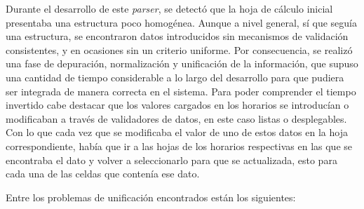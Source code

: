 Durante el desarrollo de este \textit{parser}, se detectó que la hoja de cálculo inicial presentaba una estructura poco homogénea. Aunque a nivel general, sí que seguía una estructura, se encontraron datos introducidos sin mecanismos de validación consistentes, y en ocasiones sin un criterio uniforme. Por consecuencia, se realizó una fase de depuración, normalización y unificación de la información, que supuso una cantidad de tiempo considerable a lo largo del desarrollo para que pudiera ser integrada de manera correcta en el sistema.
Para poder comprender el tiempo invertido cabe destacar que los valores cargados en los horarios se introducían o modificaban a través de validadores de datos, en este caso listas o desplegables. Con lo que cada vez que se modificaba el valor de uno de estos datos en la hoja correspondiente, había que ir a las hojas de los horarios respectivas en las que se encontraba el dato y volver a seleccionarlo para que se actualizada, esto para cada una de las celdas que contenía ese dato.

Entre los problemas de unificación encontrados están los siguientes:

